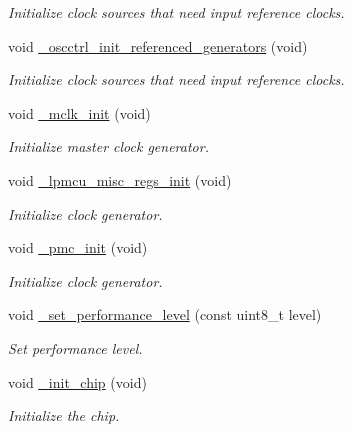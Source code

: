 \begin{DoxyCompactItemize}
\begin{DoxyCompactList}\small\item\em Initialize clock sources that need input reference clocks. \end{DoxyCompactList}\item 
\mbox{\label{group___h_p_l_ga2e4746bc23999fe1dc7c02aa4e167bfb}} 
void \hyperlink{group___h_p_l_ga2e4746bc23999fe1dc7c02aa4e167bfb}{\+\_\+oscctrl\+\_\+init\+\_\+referenced\+\_\+generators} (void)
\begin{DoxyCompactList}\small\item\em Initialize clock sources that need input reference clocks. \end{DoxyCompactList}\item 
\mbox{\label{group___h_p_l_ga840b5c5290dd94e858db4d89259ba3f4}} 
void \hyperlink{group___h_p_l_ga840b5c5290dd94e858db4d89259ba3f4}{\+\_\+mclk\+\_\+init} (void)
\begin{DoxyCompactList}\small\item\em Initialize master clock generator. \end{DoxyCompactList}\item 
\mbox{\label{group___h_p_l_ga3dd85007c9fdeed2ffe1166a33dd6519}} 
void \hyperlink{group___h_p_l_ga3dd85007c9fdeed2ffe1166a33dd6519}{\+\_\+lpmcu\+\_\+misc\+\_\+regs\+\_\+init} (void)
\begin{DoxyCompactList}\small\item\em Initialize clock generator. \end{DoxyCompactList}\item 
\mbox{\label{group___h_p_l_ga580e99e942064901ed0f02f5d8789c7a}} 
void \hyperlink{group___h_p_l_ga580e99e942064901ed0f02f5d8789c7a}{\+\_\+pmc\+\_\+init} (void)
\begin{DoxyCompactList}\small\item\em Initialize clock generator. \end{DoxyCompactList}\item 
void \hyperlink{group___h_p_l_ga1668b7fc690ec56e1f3d54d9f3b8e5f2}{\+\_\+set\+\_\+performance\+\_\+level} (const uint8\+\_\+t level)
\begin{DoxyCompactList}\small\item\em Set performance level. \end{DoxyCompactList}\item 
void \hyperlink{group___h_p_l_gac10942d1aec3f0ce14117119db5e9555}{\+\_\+init\+\_\+chip} (void)
\begin{DoxyCompactList}\small\item\em Initialize the chip. \end{DoxyCompactList}\end{DoxyCompactItemize}
